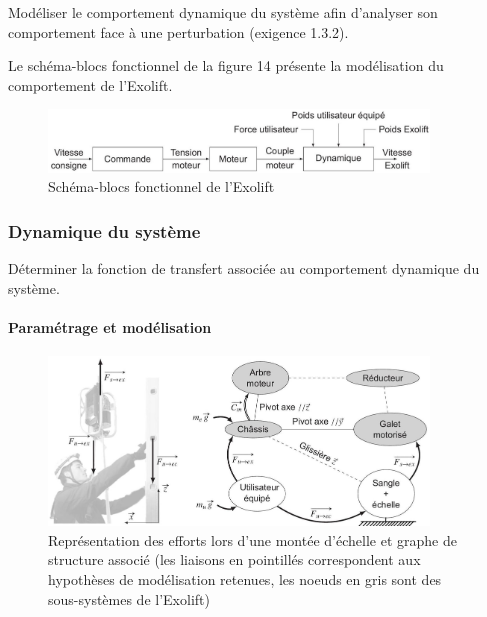 \begin{objectif}
Modéliser le comportement dynamique du système afin d'analyser son comportement face à une perturbation (exigence 1.3.2).
\end{objectif}

Le schéma-blocs fonctionnel de la figure 14 présente la modélisation du comportement de l'Exolift.

\begin{figure}[!htb]
\begin{center}
\includegraphics[width=0.9\textwidth]{images/2023_10_30_d11e80da56f59e3b3cdfg-12(1)}
\caption{Schéma-blocs fonctionnel de l'Exolift \label{fig14}}
\end{center}
\end{figure}


\subsubsection{Dynamique du système}

\begin{objectif}
Déterminer la fonction de transfert associée au comportement dynamique du système.
\end{objectif}


\paragraph{Paramétrage et modélisation}


\begin{figure}[!htb]
\begin{center}
\includegraphics[width=0.9\textwidth]{images/2023_10_30_d11e80da56f59e3b3cdfg-12}
\caption{Représentation des efforts lors d'une montée d'échelle et graphe de structure associé (les liaisons en pointillés correspondent aux hypothèses de modélisation retenues, les noeuds en gris sont des sous-systèmes de l'Exolift) \label{fig15}}
\end{center}
\end{figure}

